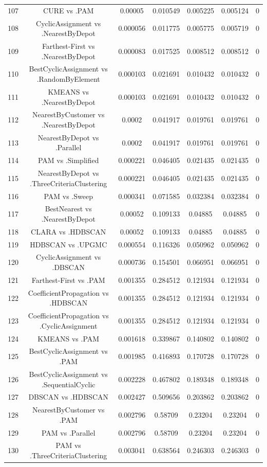 \documentclass[a4paper,10pt]{article}
\begin{document}
\begin{landscape}
\begin{table}[!htp]
\begin{tabular}{ccccccc}
107&CURE vs .PAM&0.00005&0.010549&0.005225&0.005124&0\\
108&CyclicAssignment vs .NearestByDepot&0.000056&0.011775&0.005775&0.005719&0\\
109&Farthest-First vs .NearestByDepot&0.000083&0.017525&0.008512&0.008512&0\\
110&BestCyclicAssignment vs .RandomByElement&0.000103&0.021691&0.010432&0.010432&0\\
111&KMEANS vs .NearestByDepot&0.000103&0.021691&0.010432&0.010432&0\\
112&NearestByCustomer vs .NearestByDepot&0.0002&0.041917&0.019761&0.019761&0\\
113&NearestByDepot vs .Parallel&0.0002&0.041917&0.019761&0.019761&0\\
114&PAM vs .Simplified&0.000221&0.046405&0.021435&0.021435&0\\
115&NearestByDepot vs .ThreeCriteriaClustering&0.000221&0.046405&0.021435&0.021435&0\\
116&PAM vs .Sweep&0.000341&0.071585&0.032384&0.032384&0\\
117&BestNearest vs .NearestByDepot&0.00052&0.109133&0.04885&0.04885&0\\
118&CLARA vs .HDBSCAN&0.00052&0.109133&0.04885&0.04885&0\\
119&HDBSCAN vs .UPGMC&0.000554&0.116326&0.050962&0.050962&0\\
120&CyclicAssignment vs .DBSCAN&0.000736&0.154501&0.066951&0.066951&0\\
121&Farthest-First vs .PAM&0.001355&0.284512&0.121934&0.121934&0\\
122&CoefficientPropagation vs .HDBSCAN&0.001355&0.284512&0.121934&0.121934&0\\
123&CoefficientPropagation vs .CyclicAssignment&0.001355&0.284512&0.121934&0.121934&0\\
124&KMEANS vs .PAM&0.001618&0.339867&0.140802&0.140802&0\\
125&BestCyclicAssignment vs .PAM&0.001985&0.416893&0.170728&0.170728&0\\
126&BestCyclicAssignment vs .SequentialCyclic&0.002228&0.467802&0.189348&0.189348&0\\
127&DBSCAN vs .HDBSCAN&0.002427&0.509656&0.203862&0.203862&0\\
128&NearestByCustomer vs .PAM&0.002796&0.58709&0.23204&0.23204&0\\
129&PAM vs .Parallel&0.002796&0.58709&0.23204&0.23204&0\\
130&PAM vs .ThreeCriteriaClustering&0.003041&0.638564&0.246303&0.246303&0\\

\end{tabular}
\end{table}
\end{landscape}
\end{document}
